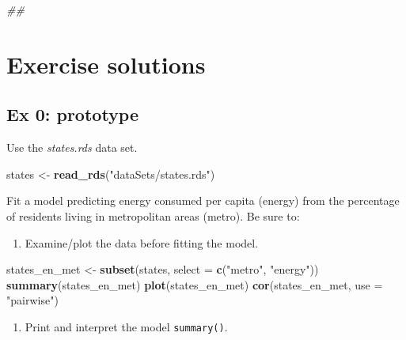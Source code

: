 \documentclass[
]{book}
\newenvironment{Shaded}{\begin{snugshade}}{\end{snugshade}}
\newcommand{\CommentTok}[1]{\textcolor[rgb]{0.56,0.35,0.01}{\textit{#1}}}
\newcommand{\DataTypeTok}[1]{\textcolor[rgb]{0.13,0.29,0.53}{#1}}
\newcommand{\KeywordTok}[1]{\textcolor[rgb]{0.13,0.29,0.53}{\textbf{#1}}}
\newcommand{\NormalTok}[1]{#1}
\newcommand{\StringTok}[1]{\textcolor[rgb]{0.31,0.60,0.02}{#1}}
\providecommand{\tightlist}{%
  \setlength{\itemsep}{0pt}\setlength{\parskip}{0pt}}
\begin{document}
\begin{Shaded}
\begin{Highlighting}[]
\CommentTok{## }
\end{Highlighting}
\end{Shaded}

\hypertarget{exercise-solutions-1}{%
\section{Exercise solutions}\label{exercise-solutions-1}}

\hypertarget{ex-0-prototype-1}{%
\subsection{Ex 0: prototype}\label{ex-0-prototype-1}}

Use the \emph{states.rds} data set.

\begin{Shaded}
\begin{Highlighting}[]
\NormalTok{  states <-}\StringTok{ }\KeywordTok{read_rds}\NormalTok{(}\StringTok{"dataSets/states.rds"}\NormalTok{)}
\end{Highlighting}
\end{Shaded}

Fit a model predicting energy consumed per capita (energy) from the percentage of residents living in metropolitan areas (metro). Be sure to:

\begin{enumerate}
\def\labelenumi{\arabic{enumi}.}
\tightlist
\item
  Examine/plot the data before fitting the model.
\end{enumerate}

\begin{Shaded}
\begin{Highlighting}[]
\NormalTok{  states_en_met <-}\StringTok{ }\KeywordTok{subset}\NormalTok{(states, }\DataTypeTok{select =} \KeywordTok{c}\NormalTok{(}\StringTok{"metro"}\NormalTok{, }\StringTok{"energy"}\NormalTok{))}
  \KeywordTok{summary}\NormalTok{(states_en_met)}
  \KeywordTok{plot}\NormalTok{(states_en_met)}
  \KeywordTok{cor}\NormalTok{(states_en_met, }\DataTypeTok{use =} \StringTok{"pairwise"}\NormalTok{)}
\end{Highlighting}
\end{Shaded}

\begin{enumerate}
\def\labelenumi{\arabic{enumi}.}
\setcounter{enumi}{1}
\tightlist
\item
  Print and interpret the model \texttt{summary()}.
\end{enumerate}
\end{document}
